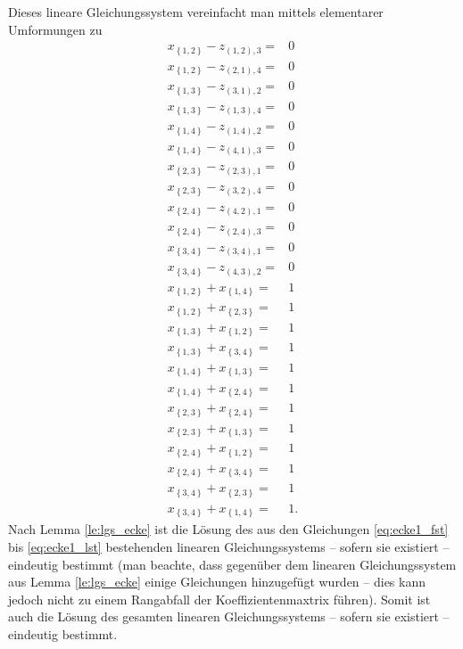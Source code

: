\documentclass[10p,a4paper,BCOR = 12mm, DIV=15]{scrbook}
\begin{document}
\begin{bew}
Dieses lineare Gleichungssystem vereinfacht man mittels elementarer Umformungen zu
{
\allowdisplaybreaks
\begin{align}
x_{\left\{1, 2\right\}} - z_{\left(1, 2\right), 3} = & 0 \nonumber \\
x_{\left\{1, 2\right\}} - z_{\left(2, 1\right), 4} = & 0 \nonumber \\
x_{\left\{1, 3\right\}} - z_{\left(3, 1\right), 2} = & 0 \nonumber \\
x_{\left\{1, 3\right\}} - z_{\left(1, 3\right), 4} = & 0 \nonumber \\
x_{\left\{1, 4\right\}} - z_{\left(1, 4\right), 2} = & 0 \nonumber \\
x_{\left\{1, 4\right\}} - z_{\left(4, 1\right), 3} = & 0 \nonumber \\
x_{\left\{2, 3\right\}} - z_{\left(2, 3\right), 1} = & 0 \nonumber \\
x_{\left\{2, 3\right\}} - z_{\left(3, 2\right), 4} = & 0 \nonumber \\
x_{\left\{2, 4\right\}} - z_{\left(4, 2\right), 1} = & 0 \nonumber \\
x_{\left\{2, 4\right\}} - z_{\left(2, 4\right), 3} = & 0 \nonumber \\
x_{\left\{3, 4\right\}} - z_{\left(3, 4\right), 1} = & 0 \nonumber \\
x_{\left\{3, 4\right\}} - z_{\left(4, 3\right), 2} = & 0 \nonumber \\
x_{\left\{1, 2\right\}} + x_{\left\{1, 4\right\}} = & 1 \label{eq:ecke1_fst} \\
x_{\left\{1, 2\right\}} + x_{\left\{2, 3\right\}} = & 1 \\
x_{\left\{1, 3\right\}} + x_{\left\{1, 2\right\}} = & 1 \\
x_{\left\{1, 3\right\}} + x_{\left\{3, 4\right\}} = & 1 \\
x_{\left\{1, 4\right\}} + x_{\left\{1, 3\right\}} = & 1 \\
x_{\left\{1, 4\right\}} + x_{\left\{2, 4\right\}} = & 1 \\
x_{\left\{2, 3\right\}} + x_{\left\{2, 4\right\}} = & 1 \\
x_{\left\{2, 3\right\}} + x_{\left\{1, 3\right\}} = & 1 \\
x_{\left\{2, 4\right\}} + x_{\left\{1, 2\right\}} = & 1 \\
x_{\left\{2, 4\right\}} + x_{\left\{3, 4\right\}} = & 1 \\
x_{\left\{3, 4\right\}} + x_{\left\{2, 3\right\}} = & 1 \\
x_{\left\{3, 4\right\}} + x_{\left\{1, 4\right\}} = & 1. \label{eq:ecke1_lst}
\end{align}
}
Nach Lemma \ref{le:lgs_ecke} ist die Lösung des aus den Gleichungen \eqref{eq:ecke1_fst} bis \eqref{eq:ecke1_lst} bestehenden linearen Gleichungssystems -- sofern sie existiert -- eindeutig bestimmt (man beachte, dass gegenüber dem linearen Gleichungssystem aus Lemma \ref{le:lgs_ecke} einige Gleichungen hinzugefügt wurden -- dies kann jedoch nicht zu einem Rangabfall der Koeffizientenmaxtrix führen). Somit ist auch die Lösung des gesamten linearen Gleichungssystems -- sofern sie existiert -- eindeutig bestimmt.


\end{bew}
\end{document}
